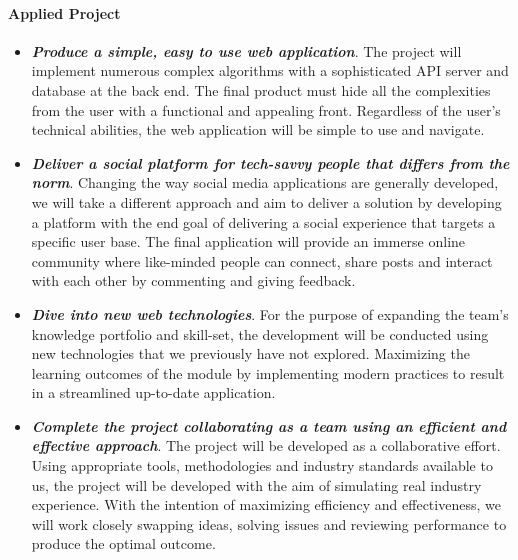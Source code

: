  \paragraph{Applied Project}
\begin{itemize}
\item \textit{\textbf{Produce a simple, easy to use web application}}. The project will implement numerous complex algorithms with a sophisticated API server and database at the back end. The final product must hide all the complexities from the user with a functional and appealing front. Regardless of the user's technical abilities, the web application will be simple to use and navigate.
\item \textit{\textbf{Deliver a social platform for tech-savvy people that differs from the norm}}. Changing the way social media applications are generally developed, we will take a different approach and aim to deliver a solution by developing a platform with the end goal of delivering a social experience that targets a specific user base. The final application will provide an immerse online community where like-minded people can connect, share posts and interact with each other by commenting and giving feedback.
\item \textit{\textbf{Dive into new web technologies}}. For the purpose of expanding the team's knowledge portfolio and skill-set, the development will be conducted using new technologies that we previously have not explored. Maximizing the learning outcomes of the module by implementing modern practices to result in a streamlined up-to-date application.
\item \textit{\textbf{Complete the project collaborating as a team using an efficient and effective approach}}. The project will be developed as a collaborative effort. Using appropriate tools, methodologies and industry standards available to us, the project will be developed with the aim of simulating real industry experience. With the intention of maximizing efficiency and effectiveness, we will work closely swapping ideas, solving issues and reviewing performance to produce the optimal outcome.
\end{itemize}


